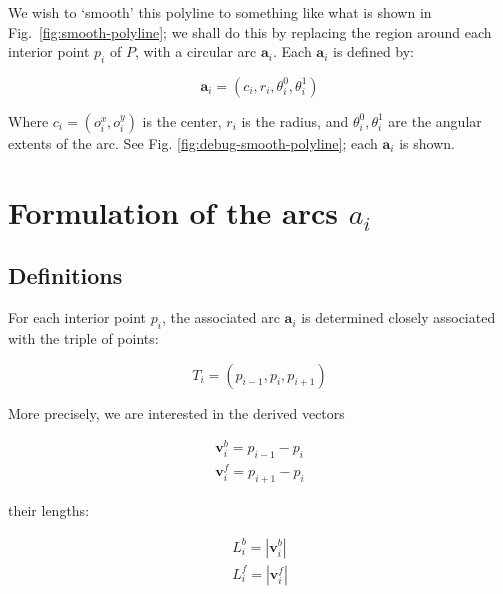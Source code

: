 \documentclass{article}
\begin{document}
We wish to `smooth' this polyline to something like what is shown in Fig.~\ref{fig:smooth-polyline}; we shall do this by replacing the region around each interior point $p_{i}$ of $P$, with a circular arc $\mathbf{a}_{i}$.  Each $\mathbf{a}_{i}$ is defined by:

\begin{equation}
  \label{eq:circ-def}
\mathbf{a}_i=\left(
  c_{i},
  r_{i},
  \theta^{0}_{i},
  \theta^{1}_{i}
\right)
\end{equation}

Where $c_{i} = (o^{x}_{i}, o^{y}_{i})$ is the center, $r_{i}$ is the radius, and $\theta^{0}_{i}, \theta^{1}_{i}$ are the angular extents of the arc.  See Fig. \ref{fig:debug-smooth-polyline}; each $\mathbf{a}_{i}$ is shown.

\section{Formulation of the arcs $a_{i}$}

\subsection{Definitions}

For each interior point $p_{i}$, the associated arc $\mathbf{a}_{i}$ is determined closely associated with the triple of points:

\begin{equation}
  \label{eq:arc-triple}
  T_{i} = \left(p_{i-1}, p_{i}, p_{i+1}\right)
\end{equation}

More precisely, we are interested in the derived vectors

\begin{equation}
  \label{eq:vectors}
  \begin{split}
  \mathbf{v}^{b}_{i} = p_{i-1} - p_{i}\\
  \mathbf{v}^{f}_{i} = p_{i+1} - p_{i}
  \end{split}
\end{equation}

their lengths:

\begin{equation}
  \label{eq:vector-lengths}
  \begin{split}
    L^{b}_{i} = |\mathbf{v}^{b}_{i}|\\
    L^{f}_{i} = |\mathbf{v}^{f}_{i}|
  \end{split}
\end{equation}
\end{document}
